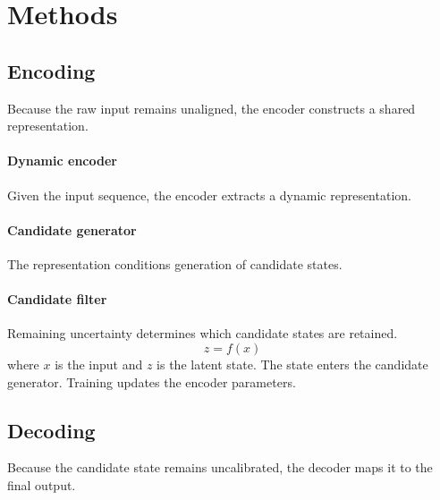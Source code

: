 \documentclass{article}
\begin{document}
\section{Methods}
\subsection{Encoding}
Because the raw input remains unaligned, the encoder constructs a shared representation.
\paragraph{Dynamic encoder}
Given the input sequence, the encoder extracts a dynamic representation.
\paragraph{Candidate generator}
The representation conditions generation of candidate states.
\paragraph{Candidate filter}
Remaining uncertainty determines which candidate states are retained.
\begin{equation}
z = f(x)
\end{equation}
where $x$ is the input and $z$ is the latent state.
The state enters the candidate generator.
Training updates the encoder parameters.
\subsection{Decoding}
Because the candidate state remains uncalibrated, the decoder maps it to the final output.
\end{document}
